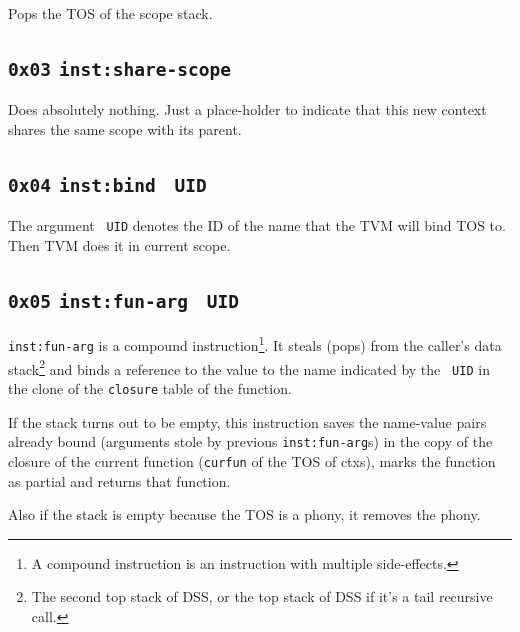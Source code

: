 \documentclass{report}
\newcommand{\mtilde}[1]{\textasciitilde}
\newcommand{\marg}[1]{\texttt{\mtilde ~#1}}
\newcommand{\inst}[1] {\texttt{inst:#1}}
\begin{document}
Pops the TOS of the scope stack.

\subsection{\texttt{0x03} \inst{share-scope}}

Does absolutely nothing. Just a place-holder to indicate that this new context shares the same scope with its parent.

\subsection{\texttt{0x04} \inst{bind} \marg{UID}}

The argument \marg{UID} denotes the ID of the name that the TVM will bind TOS to. Then TVM does it in current scope.

\subsection{\texttt{0x05} \inst{fun-arg} \marg{UID}}

\inst{fun-arg} is a compound instruction\footnote{A compound instruction is an instruction with multiple side-effects.}. It steals (pops) from the caller's data stack\footnote{The second top stack of DSS, or the top stack of DSS if it's a tail recursive call.} and binds a reference to the value to the name indicated by the \marg{UID} in the clone of the \texttt{closure} table of the function.

\begin{mdframed}[style=detail]
  If the stack turns out to be empty, this instruction saves the
  name-value pairs already bound (arguments stole by previous
  \inst{fun-arg}s) in the copy of the closure of the current function
  (\texttt{curfun} of the TOS of ctxs), marks the function as partial
  and returns that function.

  Also if the stack is empty because the TOS is a phony, it removes the
  phony.
\end{mdframed}
\end{document}
